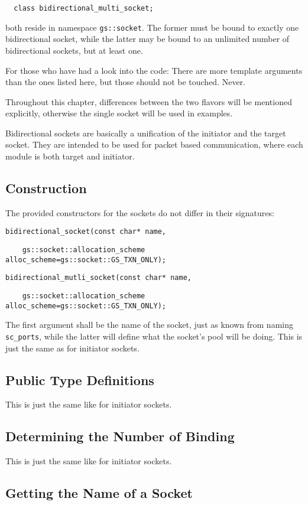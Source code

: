 \documentclass[a4paper,10pt]{article}          %
\begin{document}
\verb|  class bidirectional_multi_socket;|

\noindent both reside in namespace \verb|gs::socket|. The former must be bound to exactly one bidirectional socket, while the latter may be bound to an unlimited number of bidirectional sockets, but at least one.

For those who have had a look into the code: There are more template arguments than the ones listed here, but those should not be touched. Never.

Throughout this chapter, differences between the two flavors will be mentioned explicitly, otherwise the single socket will be used in examples.

Bidirectional sockets are basically a unification of the initiator and the target socket. They are intended to be used for packet based communication, where each module is both target and initiator.

\subsection{Construction}
The provided constructors for the sockets do not differ in their signatures:

\verb|bidirectional_socket(const char* name, |

\verb|    gs::socket::allocation_scheme alloc_scheme=gs::socket::GS_TXN_ONLY);|

\verb|bidirectional_mutli_socket(const char* name, |

\verb|    gs::socket::allocation_scheme alloc_scheme=gs::socket::GS_TXN_ONLY);|

The first argument shall be the name of the socket, just as known from naming \verb|sc_ports|, while the latter will define what the socket's pool will be doing. This is just the same as for initiator sockets.

\subsection{Public Type Definitions}

This is just the same like for initiator sockets.

\subsection{Determining the Number of Binding}

This is just the same like for initiator sockets.

\subsection{Getting the Name of a Socket}
\end{document}
